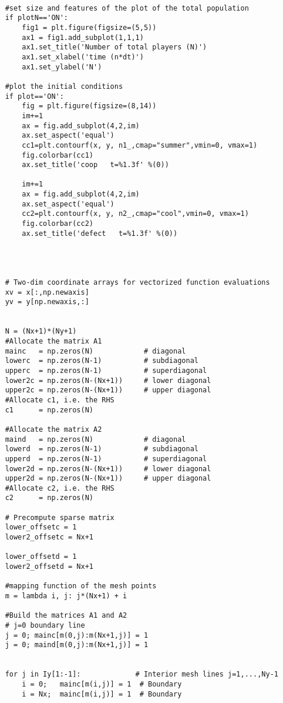 \begin{lstlisting}
    
    #set size and features of the plot of the total population
    if plotN=='ON':
        fig1 = plt.figure(figsize=(5,5))           
        ax1 = fig1.add_subplot(1,1,1)
        ax1.set_title('Number of total players (N)')
        ax1.set_xlabel('time (n*dt)')
        ax1.set_ylabel('N')
    
    #plot the initial conditions
    if plot=='ON':
        fig = plt.figure(figsize=(8,14))
        im+=1
        ax = fig.add_subplot(4,2,im)
        ax.set_aspect('equal')
        cc1=plt.contourf(x, y, n1_,cmap="summer",vmin=0, vmax=1)
        fig.colorbar(cc1)
        ax.set_title('coop   t=%1.3f' %(0))

        im+=1
        ax = fig.add_subplot(4,2,im)
        ax.set_aspect('equal')
        cc2=plt.contourf(x, y, n2_,cmap="cool",vmin=0, vmax=1)
        fig.colorbar(cc2)
        ax.set_title('defect   t=%1.3f' %(0))
        


    
    # Two-dim coordinate arrays for vectorized function evaluations
    xv = x[:,np.newaxis]
    yv = y[np.newaxis,:]

    
    N = (Nx+1)*(Ny+1)
    #Allocate the matrix A1
    mainc   = np.zeros(N)            # diagonal
    lowerc  = np.zeros(N-1)          # subdiagonal
    upperc  = np.zeros(N-1)          # superdiagonal
    lower2c = np.zeros(N-(Nx+1))     # lower diagonal
    upper2c = np.zeros(N-(Nx+1))     # upper diagonal
    #Allocate c1, i.e. the RHS
    c1      = np.zeros(N)
    
    #Allocate the matrix A2
    maind   = np.zeros(N)            # diagonal
    lowerd  = np.zeros(N-1)          # subdiagonal
    upperd  = np.zeros(N-1)          # superdiagonal
    lower2d = np.zeros(N-(Nx+1))     # lower diagonal
    upper2d = np.zeros(N-(Nx+1))     # upper diagonal
    #Allocate c2, i.e. the RHS
    c2      = np.zeros(N)

    # Precompute sparse matrix
    lower_offsetc = 1
    lower2_offsetc = Nx+1
    
    lower_offsetd = 1
    lower2_offsetd = Nx+1

    #mapping function of the mesh points
    m = lambda i, j: j*(Nx+1) + i
    
    #Build the matrices A1 and A2
    # j=0 boundary line
    j = 0; mainc[m(0,j):m(Nx+1,j)] = 1  
    j = 0; maind[m(0,j):m(Nx+1,j)] = 1
    
    
    for j in Iy[1:-1]:             # Interior mesh lines j=1,...,Ny-1
        i = 0;   mainc[m(i,j)] = 1  # Boundary
        i = Nx;  mainc[m(i,j)] = 1  # Boundary
        

\end{lstlisting}
